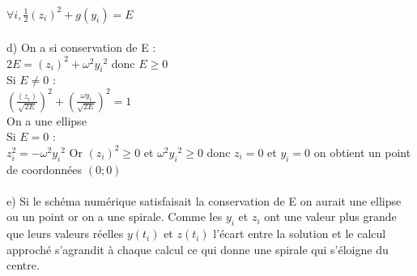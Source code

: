 \documentclass{article}
\begin{document}
$\forall i, \frac{1}{2} (z_i)^2 + g(y_i)=E$ \\
 \\
d) On a si conservation de E : \\
$2E= (z_{i})^2 + \omega^2 {y_i}^2$ donc $E\geq 0$ \\
Si $E \neq 0$ :\\
$(\frac{(z_{i})}{\sqrt{2E}})^2 + (\frac{\omega y_i}{\sqrt{2E}})^2=1$ \\
On a une ellipse \\
Si $E=0$ : \\
$z_{i}^2 = - \omega^2 {y_i}^2$ Or $(z_i)^2 \geq 0$ et $\omega^2 {y_i}^2 \geq 0$ donc $z_i=0$ et $y_i=0$ on obtient un point de coordonnées $(0;0)$ \\
\\
e) Si le schéma numérique satisfaisait la conservation de E on aurait une ellipse ou un point or on a une spirale. Comme les $y_i$ et $z_i$ ont une valeur plus grande que leurs valeurs réelles $y(t_i)$ et $z(t_i)$ l'écart entre la solution et le calcul approché s'agrandit à chaque calcul ce qui donne une spirale qui s'éloigne du centre. \\
\end{document}
